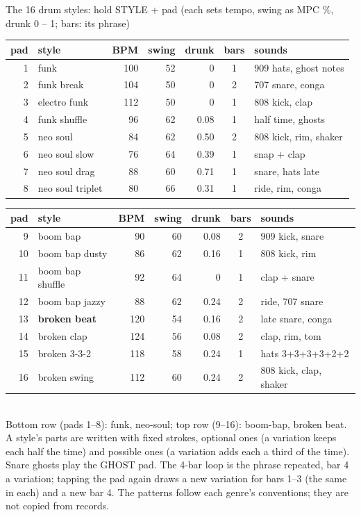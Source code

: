 \documentclass{article}
\newcommand{\DR}[1]{\textcolor{drc}{#1}}
\begin{document}
\vspace{1.5mm}
\begin{minipage}[t]{150mm}\vspace{0pt}
\begin{card}{The 16 drum styles: hold STYLE + pad \quad\textmd{\fontsize{6.5}{7}\selectfont (each sets tempo, swing as MPC \%, drunk 0 -- 1; bars: its phrase)}}
\fontsize{7}{8.4}\selectfont
\setlength{\tabcolsep}{1.9pt}
\begin{tabular}[t]{@{}r l r r r c l@{}}
pad & style & BPM & swing & drunk & bars & sounds \\ \hline
1 & funk & 100 & 52 & 0 & 1 & 909 hats, ghost notes \\
2 & funk break & 104 & 50 & 0 & 2 & 707 snare, conga \\
3 & electro funk & 112 & 50 & 0 & 1 & 808 kick, clap \\
4 & funk shuffle & 96 & 62 & 0.08 & 1 & half time, ghosts \\
5 & neo soul & 84 & 62 & 0.50 & 2 & 808 kick, rim, shaker \\
6 & neo soul slow & 76 & 64 & 0.39 & 1 & snap + clap \\
7 & neo soul drag & 88 & 60 & 0.71 & 1 & snare, hats late \\
8 & neo soul triplet & 80 & 66 & 0.31 & 1 & ride, rim, conga \\
\end{tabular}\hfill
\begin{tabular}[t]{@{}r l r r r c l@{}}
pad & style & BPM & swing & drunk & bars & sounds \\ \hline
9 & boom bap & 90 & 60 & 0.08 & 2 & 909 kick, snare \\
10 & boom bap dusty & 86 & 62 & 0.16 & 1 & 808 kick, rim \\
11 & boom bap shuffle & 92 & 64 & 0 & 1 & clap + snare \\
12 & boom bap jazzy & 88 & 62 & 0.24 & 2 & ride, 707 snare \\
13 & \textbf{broken beat} & 120 & 54 & 0.16 & 2 & late snare, conga \\
14 & broken clap & 124 & 56 & 0.08 & 2 & clap, rim, tom \\
15 & broken 3-3-2 & 118 & 58 & 0.24 & 1 & hats 3+3+3+3+2+2 \\
16 & broken swing & 112 & 60 & 0.24 & 2 & 808 kick, clap, shaker \\
\end{tabular}\\[0.6mm]
Bottom row (pads 1--8): funk, neo-soul; top row (9--16): boom-bap, broken beat. A style's parts are written
with fixed strokes, optional ones (a variation keeps each half the time) and possible ones (a variation adds
each a third of the time). Snare ghosts play the \DR{GHOST} pad. The 4-bar loop is the phrase repeated, bar 4 a
variation; tapping the pad again draws a new variation for bars 1--3 (the same in each) and a new bar 4.
The patterns follow each genre's conventions; they are not copied from records.
\end{card}


\end{minipage}
\end{document}
